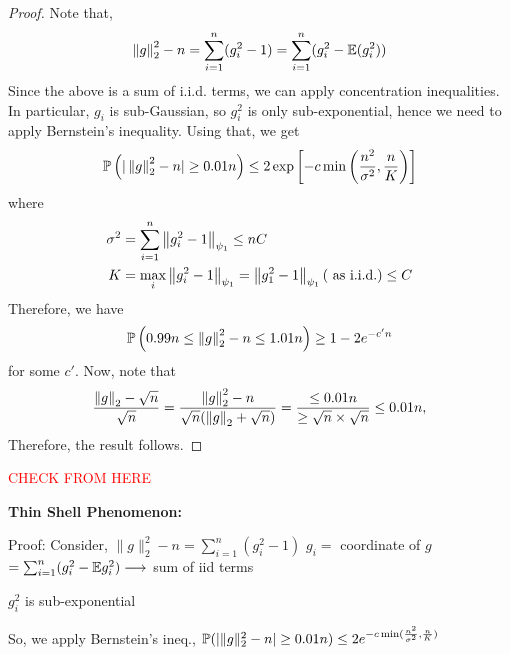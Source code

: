 \documentclass[12pt]{article}
\newcommand{\sr}[1]{\textcolor{red}{#1}}
\begin{document}
\begin{proof}
    Note that,
    \begin{equation*}
        \left\Vert g \right\Vert_2^2 - n
        = \sum_{i=1}^n (g_i^2 - 1)
        = \sum_{i=1}^n (g_i^2 - \mathbb{E}(g_i^2))
    \end{equation*}
    \noindent Since the above is a sum of i.i.d. terms, we can apply concentration inequalities. In particular, $g_i$ is sub-Gaussian, so $g_i^2$ is only sub-exponential, hence we need to apply Bernstein's inequality. Using that, we get
    \begin{equation*}
        \mathbb{P}\left( \vert \left\Vert g \right\Vert_2^2 - n\vert \geq 0.01n \right) \leq 2 \exp\left[ - c\min\left( \dfrac{n^2}{\sigma^2}, \dfrac{n}{K} \right) \right]
    \end{equation*}
    \noindent where
    \begin{align*}
        \sigma^2 & = \sum_{i=1}^n \left\Vert g_i^2 - 1 \right\Vert_{\psi_1} \leq nC                                            \\
        K        & = \max_{i} \left\Vert g_i^2 - 1 \right\Vert_{\psi_1} = \left\Vert g_1^2 - 1 \right\Vert_{\psi_1} (\text{ as i.i.d.}) \leq C
    \end{align*}
    \noindent Therefore, we have
    \begin{equation*}
        \mathbb{P}\left( 0.99n \leq \left\Vert g \right\Vert_2^2 - n \leq 1.01n \right) \geq 1 - 2e^{-c' n}
    \end{equation*}
    \noindent for some $c'$. Now, note that
    \begin{equation*}
        \dfrac{\left\Vert g \right\Vert_2 - \sqrt{n}}{\sqrt{n}} = \dfrac{\left\Vert g \right\Vert_2^2 - n}{\sqrt{n}(\left\Vert g \right\Vert_2 + \sqrt{n})} = \dfrac{\leq 0.01n}{\geq \sqrt{n} \times \sqrt{n}} \leq 0.01n,
    \end{equation*}
    \noindent Therefore, the result follows.
\end{proof}



\pagebreak
\sr{CHECK FROM HERE}




\textbf{Thin Shell Phenomenon:}

Proof: Consider, $\|g\|_2^2 - n = \sum_{i=1}^n (g_i^2 - 1)$ \hspace*{2cm} $g_i =$ coordinate of $g$
\hspace*{4cm} $= \sum_{i=1}^n (g_i^2 - \mathbb{E} g_i^2) \longrightarrow$ sum of iid terms

$g_i^2$ is sub-exponential

So, we apply Bernstein's ineq., $\mathbb{P}(|\|g\|_2^2 - n| \geq 0.01 n) \leq 2e^{-c \min(\frac{n^2}{\sigma^2}, \frac{n}{K})}$
\end{document}
